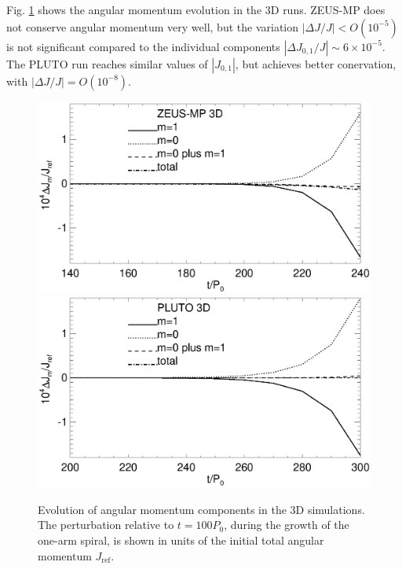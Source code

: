 Fig. \ref{3d_angmom} shows the angular momentum evolution in the 3D
runs. ZEUS-MP does not conserve angular momentum very well, but
the variation $|\Delta J/J|< O(10^{-5})$ is not significant compared
to the individual components $|\Delta J_{0,1}/J|\sim 
6\times10^{-5}$. The PLUTO run reaches similar values of
$|J_{0,1}|$, but achieves better conervation, with $|\Delta
J/J|=O(10^{-8})$. 

\begin{figure}
  \includegraphics[scale=.41,clip=true,trim=0cm 1cm 0cm 0cm]{figures/nonaxi_evol_ang_zeus}
  \includegraphics[scale=.41]{figures/nonaxi_evol_ang_pluto}
  \caption{Evolution of angular momentum components in the 3D 
    simulations. The perturbation 
    relative to $t=100P_0$, during the growth of the one-arm spiral,
    is shown in units of the initial total angular momentum
    $J_\mathrm{ref}$.\label{3d_angmom}}  
\end{figure}   

